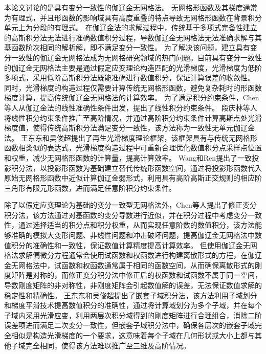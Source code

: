 本论文讨论的是具有变分一致性的伽辽金无网格法\cite{babuska2008,wu2021}。
无网格形函数及其梯度通常为有理式，并且形函数的影响域具有高度重叠的特点导致无网格形函数在背景积分单元上为分段的有理式。
在伽辽金法的求解过程中，传统基于多项式完备性建立的高斯积分法无法进行准确数值积分过程，导数伽辽金无网格法无法准确求解与其基函数阶次相同的解析解，即不满足变分一致性\cite{1999Numerical}。
为了解决该问题，建立具有变分一致性的伽辽金无网格法成为无网格研究领域的热门问题。目前具有变分一致性的伽辽金无网格法主要是通过假定应变理论构造匹配的光滑梯度，光滑梯度为低阶多项式，采用低阶高斯积分法既能准确进行数值积分，保证计算误差的收敛性。
同时，光滑梯度的构造过程仅需要计算传统无网格形函数，避免复杂耗时的形函数梯度计算，提高传统伽辽金无网格法的计算效率。
为了满足积分约束条件，Chen等人从伽辽金法的线性准确性条件出发，提出了线性积分约束条件\cite{chen2001}。
段庆林等人\cite{陈嵩涛2020几何非线性分析的高效高阶无网格法,duan2012}将线性积分约束条件推广至高阶情况，并通过高阶积分约束条件计算高斯点处光滑梯度值，使得传统高斯积分法满足变分一致性，该方法称为一致性无单元伽辽金法。
王东东和吴俊超提出了再生光滑梯度理论框架\cite{wang2019}，该框架具有与传统无网格形函数相类似的表达式，光滑梯度构造过程中可重新合理优化数值积分点采样点位置和权重，减少无网格形函数的计算量，提高计算效率。
Wang和Ren\cite{wang2023}提出了一致投影积分法，以投影形函数为基础建立替代传统形函数空间，通过将投影形函数代入原始无网格形函数中近似计算伽辽金弱形式，利用具有高阶高斯正交规则的相应阶三角形有限元形函数，进而满足任意阶积分约束条件。

除了以假定应变理论为基础的变分一致型无网格法外，Chen等人\cite{chen1996}提出了修正变分积分法，该方法通过对基函数的变分导数进行近似，并在积分过程中考虑变分一致性，通过选择适当的积分点和积分权重，从而实现任意阶数的数值积分，该方法能够准确的模拟大变形问题、非线性问题和冲击破坏问题，提高伽辽金无网格法中数值积分的准确性和一致性，保证数值计算精度提高计算效率。
但使用伽辽金无网格法求解偏微分方程通常会使用试函数和权函数进行构建离散形式的方程，在伽辽金无网格法中，试函数和权函数通常属于相同的函数空间，从而确保离散形式的刚度矩阵是对称的，而修正变分积分法中修正后的权函数和试函数不属于同一空间，导数刚度矩阵的非对称性，非刚度矩阵会引起数值解的误差，无法保证数值求解的稳定性和精确性。
王东东和吴俊超提出了嵌套子域积分法\cite{wang2016}，该方法利用子域划分和梯度平滑技术提高数值积分的准确性，通过将计算域划分为多个子域，并在每个子域内采用光滑应变，利用两层次积分域得到的刚度矩阵进行合理组合，消除二阶误差项进而满足二次变分一致性，但嵌套子域积分法中，确保各层次的嵌套子域完全相似是构造光滑梯度的一个要求，这意味着每个子域在几何形状或大小上都与其他子域完全相同，使得该方法难以推广至三维及高阶情况。

